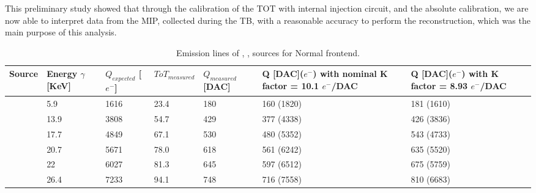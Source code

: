 This preliminary study showed that through the calibration of the TOT with internal injection circuit, and the absolute calibration, we are now able to interpret data from the MIP, collected during the TB,  with a reasonable accuracy to perform the reconstruction, which was the main purpose of this analysis.

\begin{table}[h!]
\centering
\begin{tabular}{C{1.2cm}|C{1.5cm}|C{1.5cm}|C{1.8cm}|C{1.6cm}|C{2.1cm}|C{2.1cm}}
\hline
Source & Energy $\gamma$ [KeV] & $Q_{expected}$ [$e^{-}$] & $ToT_{measured}$ & $Q_{measured}$ [DAC] & Q [DAC]($e^{-}$) \footnotesize{with nominal K factor = 10.1 $e^{-}$/DAC} & Q [DAC]($e^{-}$) \footnotesize{with  K factor = 8.93 $e^{-}$/DAC}\\[2ex]
\hline
\hline
{} & 5.9 & 1616 & 23.4 & 180 & 160 (1820) & 181 (1610) \\[0.5ex]
\hline
{} & 13.9 & 3808 & 54.7 & 429 & 377 (4338) & 426 (3836) \\[0.5ex]
\hline
{} & 17.7 & 4849 & 67.1 & 530 & 480 (5352) & 543 (4733) \\[0.5ex]
\hline
{} & 20.7 & 5671 & 78.0 & 618 & 561 (6242) & 635 (5520) \\[0.5ex]
\hline
{} & 22 & 6027 & 81.3 & 645 & 597 (6512) & 675 (5759) \\[0.5ex]
\hline
{} & 26.4 & 7233 & 94.1 & 748 & 716 (7558) & 810 (6683) \\[0.5ex]
\hline
\hline
\end{tabular}
\caption{Emission lines of , ,  sources for Normal frontend.}
\label{tab:source_conv_norm}
\end{table}

